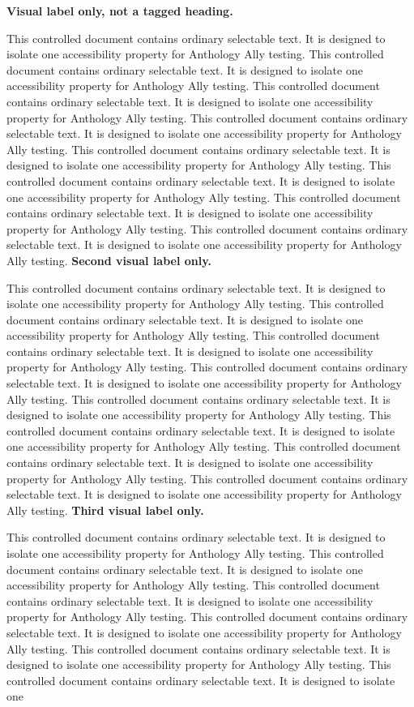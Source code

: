 \documentclass[11pt]{article}
\begin{document}
\textbf{Visual label only, not a tagged heading.}\par This controlled document contains ordinary selectable text. It is designed to isolate one accessibility property for Anthology Ally testing. This controlled document contains ordinary selectable text. It is designed to isolate one accessibility property for Anthology Ally testing. This controlled document contains ordinary selectable text. It is designed to isolate one accessibility property for Anthology Ally testing. This controlled document contains ordinary selectable text. It is designed to isolate one accessibility property for Anthology Ally testing. This controlled document contains ordinary selectable text. It is designed to isolate one accessibility property for Anthology Ally testing. This controlled document contains ordinary selectable text. It is designed to isolate one accessibility property for Anthology Ally testing. This controlled document contains ordinary selectable text. It is designed to isolate one accessibility property for Anthology Ally testing. This controlled document contains ordinary selectable text. It is designed to isolate one accessibility property for Anthology Ally testing. \newpage\textbf{Second visual label only.}\par This controlled document contains ordinary selectable text. It is designed to isolate one accessibility property for Anthology Ally testing. This controlled document contains ordinary selectable text. It is designed to isolate one accessibility property for Anthology Ally testing. This controlled document contains ordinary selectable text. It is designed to isolate one accessibility property for Anthology Ally testing. This controlled document contains ordinary selectable text. It is designed to isolate one accessibility property for Anthology Ally testing. This controlled document contains ordinary selectable text. It is designed to isolate one accessibility property for Anthology Ally testing. This controlled document contains ordinary selectable text. It is designed to isolate one accessibility property for Anthology Ally testing. This controlled document contains ordinary selectable text. It is designed to isolate one accessibility property for Anthology Ally testing. This controlled document contains ordinary selectable text. It is designed to isolate one accessibility property for Anthology Ally testing. \newpage\textbf{Third visual label only.}\par This controlled document contains ordinary selectable text. It is designed to isolate one accessibility property for Anthology Ally testing. This controlled document contains ordinary selectable text. It is designed to isolate one accessibility property for Anthology Ally testing. This controlled document contains ordinary selectable text. It is designed to isolate one accessibility property for Anthology Ally testing. This controlled document contains ordinary selectable text. It is designed to isolate one accessibility property for Anthology Ally testing. This controlled document contains ordinary selectable text. It is designed to isolate one accessibility property for Anthology Ally testing. This controlled document contains ordinary selectable text. It is designed to isolate one 
\end{document}
